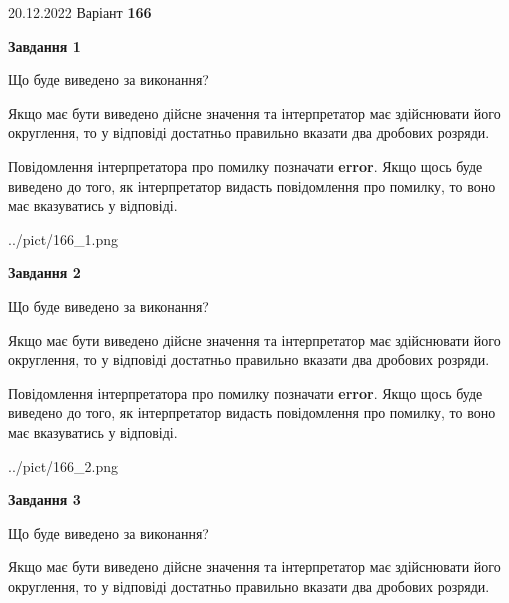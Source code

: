 \documentclass[12pt, ukrainian]{article}
\begin{document}
{20.12.2022 Варіант \No \textbf { 166 }\par}
{
\begin {Large}

{\begin {center}\textbf{Завдання 1}\end {center}}\par
Що буде виведено за виконання? \par

Якщо має бути виведено дійсне значення та інтерпретатор має здійснювати його округлення, 
то у відповіді достатньо правильно вказати два дробових розряди.

Повідомлення інтерпретатора про помилку позначати \textbf{error}.
Якщо щось буде виведено до того, як інтерпретатор видасть повідомлення про помилку, 
то воно має вказуватись у відповіді. \par

\begin{center}
	{../pict/166_1.png}
\end{center}
\newpage

{\begin {center}\textbf{Завдання 2}\end {center}}\par
Що буде виведено за виконання? \par

Якщо має бути виведено дійсне значення та інтерпретатор має здійснювати його округлення, 
то у відповіді достатньо правильно вказати два дробових розряди.

Повідомлення інтерпретатора про помилку позначати \textbf{error}.
Якщо щось буде виведено до того, як інтерпретатор видасть повідомлення про помилку, 
то воно має вказуватись у відповіді. \par

\begin{center}
	{../pict/166_2.png}
\end{center}
\newpage

{\begin {center}\textbf{Завдання 3}\end {center}}\par
Що буде виведено за виконання? \par

Якщо має бути виведено дійсне значення та інтерпретатор має здійснювати його округлення, 
то у відповіді достатньо правильно вказати два дробових розряди.


\end{Large}}
\end{document}

